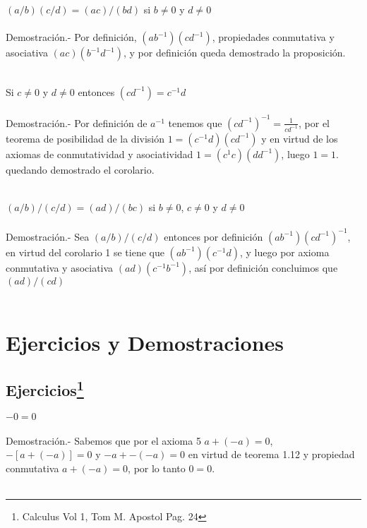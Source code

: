 \begin{teo}
$(a/b)(c/d)=(ac)/(bd)$ si $b\neq 0$ y $d\neq 0$\\\\
Demostración.- \;
Por definición, $(ab^{-1})(cd^{-1})$, propiedades conmutativa y asociativa $(ac)(b^{-1}d^{-1})$, y por definición queda demostrado la proposición.\\\\
\end{teo}

\begin{col.}
Si $c\neq 0$ y $d\neq 0$ entonces $(cd^{-1})=c^{-1}d$\\\\
Demostración.- \;
Por definición de $a^{-1}$ tenemos que $(cd^{-1})^{-1}=\displaystyle\frac{1}{cd^{-1}}$, por el teorema de posibilidad de la división $1=(c^{-1}d)(cd^{-1})$ y en virtud de los axiomas de conmutatividad y asociatividad $1=(c^{1}c)(dd^{-1})$, luego $1=1$. quedando demostrado el corolario.\\\\
\end{col.}

\begin{teo}
$(a/b)/(c/d)=(ad)/(bc)$ si $b\neq 0$,  $c\neq 0$ y $d\neq 0$\\\\
Demostración.- \;
Sea $(a/b)/(c/d)$ entonces por definición $(ab^{-1})(cd^{-1})^{-1}$, en virtud del corolario 1 se tiene que $(ab^{-1})(c^{-1}d)$, y luego por axioma conmutativa y asociativa $(ad)(c^{-1}b^{-1})$, así por definición concluimos que $(ad)/(cd)$\\\\
\end{teo}

\section{Ejercicios y Demostraciones}
\subsection[Ejercicios]{Ejercicios\footnote{Calculus Vol 1, Tom M. Apostol Pag. 24}}
\begin{teo}
$-0=0$\\\\
Demostración.- \;
Sabemos que por el axioma 5 $a+(-a)=0$, $- \left[ a+(-a) \right] = 0$ y $-a+-(-a)=0$ en virtud de teorema 1.12 y propiedad conmutativa $a+(-a)=0$, por lo tanto $0=0$.\\\\ 
\end{teo}

